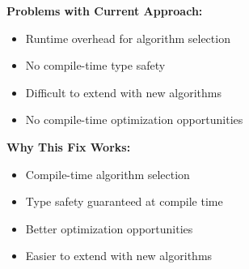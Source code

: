 \documentclass[11pt,a4paper]{article}
\begin{document}
\textcolor{problemred}{\textbf{Problems with Current Approach:}}
\begin{itemize}
    \item Runtime overhead for algorithm selection
    \item No compile-time type safety
    \item Difficult to extend with new algorithms
    \item No compile-time optimization opportunities
\end{itemize}

\textcolor{solutiongreen}{\textbf{Why This Fix Works:}}
\begin{itemize}
    \item Compile-time algorithm selection
    \item Type safety guaranteed at compile time
    \item Better optimization opportunities
    \item Easier to extend with new algorithms
\end{itemize}
\end{document}
